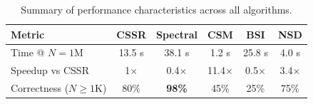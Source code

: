 \begin{table}[htbp]
\centering
\begin{tabular}{lccccc}
\toprule
\textbf{Metric} & \textbf{CSSR} & \textbf{Spectral} & \textbf{CSM} & \textbf{BSI} & \textbf{NSD} \\
\midrule
Time @ $N=1$M & 13.5 s & 38.1 s & 1.2 s & 25.8 s & 4.0 s \\
Speedup vs CSSR & 1$\times$ & 0.4$\times$ & 11.4$\times$ & 0.5$\times$ & 3.4$\times$ \\
Correctness ($N \geq 1$K) & 80\% & \textbf{98\%} & 45\% & 25\% & 75\% \\
\bottomrule
\end{tabular}
\caption{Summary of performance characteristics across all algorithms.}
\label{tab:perf-summary}
\end{table}

